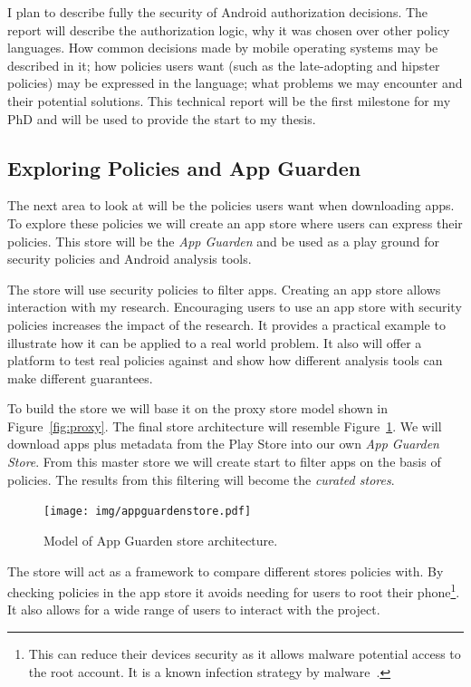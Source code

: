 \documentclass[a4paper]{article}
\begin{document}
I plan to describe fully the security of Android authorization decisions. The
report will describe the authorization logic, why it was chosen over other
policy languages.  How common decisions made by mobile operating systems may be
described in it; how policies users want (such as the late-adopting and hipster
policies) may be expressed in the language; what problems we may encounter and
their potential solutions.  This technical report will be the first milestone
for my PhD and will be used to provide the start to my thesis.


\subsection{Exploring Policies and App Guarden}

The next area to look at will be the policies users want when downloading apps.
To explore these policies we will create an app store where users can express
their policies.  This store will be the \emph{App Guarden} and be used as a play
ground for security policies and Android analysis tools.

The store will use security policies to filter apps.  Creating an app store
allows interaction with my research.  Encouraging users to use an app store with
security policies increases the impact of the research. It provides a practical
example to illustrate how it can be applied to a real world problem.  It also
will offer a platform to test real policies against and show how different
analysis tools can make different guarantees.  

To build the store we will base it on the proxy store model shown in
Figure~\ref{fig:proxy}.  The final store architecture will resemble
Figure~\ref{fig:appguardenstore}.  We will download apps plus metadata from the Play Store
into our own \emph{App Guarden Store}.  From this master store we will create
start to filter apps on the basis of policies.  The results from this filtering
will become the \emph{curated stores}. 

\begin{figure}
  \centering
  \texttt{[image: img/appguardenstore.pdf]}
  \caption{Model of App Guarden store architecture.}
  \label{fig:appguardenstore}
\end{figure}

The store will act as a framework to compare different stores
policies with.  By checking policies in the app store it avoids
needing for users to root their phone\footnote{This can reduce their
devices security as it allows malware potential access to the root account.  It
is a known infection strategy by malware~\cite{Svajcer:2012wy}.}.
It also allows for a wide range of users to interact with the project. 
\end{document}
